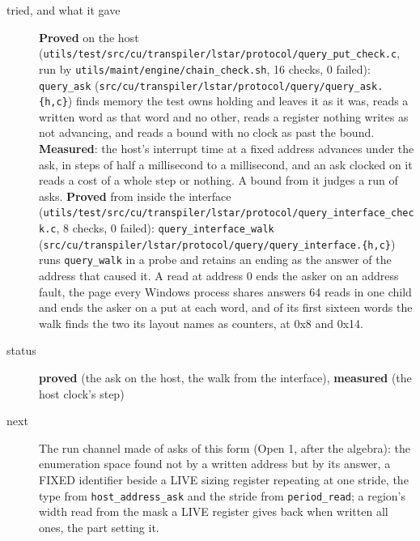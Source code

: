 \begin{description}
\item[{tried, and what it gave}] \textbf{Proved} on the host (\texttt{utils/\allowbreak{}test/\allowbreak{}src/\allowbreak{}cu/\allowbreak{}transpiler/\allowbreak{}lstar/\allowbreak{}protocol/\allowbreak{}query\_\allowbreak{}put\_\allowbreak{}check.\allowbreak{}c}, run by \texttt{utils/\allowbreak{}maint/\allowbreak{}engine/\allowbreak{}chain\_\allowbreak{}check.\allowbreak{}sh}, 16 checks, 0 failed): \texttt{query\_\allowbreak{}ask} (\texttt{src/\allowbreak{}cu/\allowbreak{}transpiler/\allowbreak{}lstar/\allowbreak{}protocol/\allowbreak{}query/\allowbreak{}query\_\allowbreak{}ask.\allowbreak{}\{h,c\}}) finds memory the test owns holding and leaves it as it was, reads a written word as that word and no other, reads a register nothing writes as not advancing, and reads a bound with no clock as past the bound. \textbf{Measured}: the host's interrupt time at a fixed address advances under the ask, in steps of half a millisecond to a millisecond, and an ask clocked on it reads a cost of a whole step or nothing. A bound from it judges a run of asks. \textbf{Proved} from inside the interface (\texttt{utils/\allowbreak{}test/\allowbreak{}src/\allowbreak{}cu/\allowbreak{}transpiler/\allowbreak{}lstar/\allowbreak{}protocol/\allowbreak{}query\_\allowbreak{}interface\_\allowbreak{}check.\allowbreak{}c}, 8 checks, 0 failed): \texttt{query\_\allowbreak{}interface\_\allowbreak{}walk} (\texttt{src/\allowbreak{}cu/\allowbreak{}transpiler/\allowbreak{}lstar/\allowbreak{}protocol/\allowbreak{}query/\allowbreak{}query\_\allowbreak{}interface.\allowbreak{}\{h,c\}}) runs \texttt{query\_\allowbreak{}walk} in a probe and retains an ending as the answer of the address that caused it. A read at address 0 ends the asker on an address fault, the page every Windows process shares answers 64 reads in one child and ends the asker on a put at each word, and of its first sixteen words the walk finds the two its layout names as counters, at 0x8 and 0x14.
\item[{status}] \textbf{proved} (the ask on the host, the walk from the interface), \textbf{measured} (the host clock's step)
\item[{next}] The run channel made of asks of this form (Open 1, after the algebra): the enumeration space found not by a written address but by its answer, a FIXED identifier beside a LIVE sizing register repeating at one stride, the type from \texttt{host\_\allowbreak{}address\_\allowbreak{}ask} and the stride from \texttt{period\_\allowbreak{}read}; a region's width read from the mask a LIVE register gives back when written all ones, the part setting it.
\end{description}

